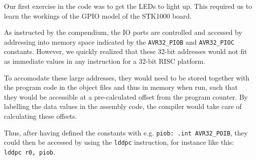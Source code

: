 Our first exercise in the code was to get the LEDs to light up. This
required us to learn the workings of the GPIO model of the STK1000
board.

As instructed by the compendium, the IO ports are controlled and
accessed by addressing into memory space indicated by the
\texttt{AVR32\_PIOB} and \texttt{AVR32\_PIOC} constants. However, we
quickly realized that these 32-bit addresses would not fit as immediate
values in any instruction for a 32-bit RISC platform.

To accomodate these large addresses, they would need to be stored
together with the program code in the object files and thus in memory
when run, such that they would be accessible at a pre-calculated offset
from the program counter. By labelling the data values in the assembly
code, the compiler would take care of calculating these offsets.

Thus, after having defined the constants with e.g. \texttt{piob: .int
AVR32\_POIB}, they could then be accessed by using the \texttt{lddpc}
instruction, for instance like this: \texttt{lddpc r0, piob}.




